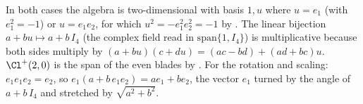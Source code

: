 In both cases the algebra is two-dimensional with basis $1, u$ where $u = e_1$ (with $e_1^{2} = -1$) or $u = e_1 e_2$, for which $u^{2} = -e_1^{2}e_2^{2} = -1$ by . The linear bijection $a + bu \mapsto a + b\,I_4$ (the complex field read in $\mathrm{span}\{1, I_4\}$) is multiplicative because both sides multiply by $(a + bu)(c + du) = (ac - bd) + (ad + bc)u$. $\Cl^{+}(2,0)$ is the span of the even blades by . For the rotation and scaling: $e_1 e_1 e_2 = e_2$, so $e_1(a + b\, e_1e_2) = a e_1 + b e_2$, the vector $e_1$ turned by the angle of $a + b\,I_4$ and stretched by $\sqrt{a^{2} + b^{2}}$.
